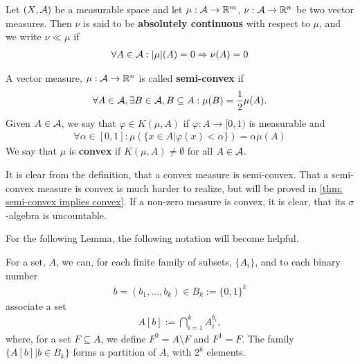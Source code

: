 
\begin{definition}
Let $(X, \mathcal{A})$ be a measurable space and let $\mu: \mathcal{A} \to \mathbb{R}^{m}$, $\nu: \mathcal{A} \to \mathbb{R}^{n}$ be two vector measures. Then $\nu$ is said to be \textbf{absolutely continuous} with respect to $\mu$, and we write $\nu \ll \mu$ if
\begin{align*}
	\forall A\in \mathcal{A} : |\mu|(A) = 0 \Rightarrow \nu(A) = 0
\end{align*}
\end{definition}



\begin{definition}\label{def: convex measure} %
A vector measure, $\mu:\mathcal{A} \to \mathbb{R}^{n}$ is called \textbf{semi-convex} if
\begin{align*}
	\forall A \in \mathcal{A}, \exists B \in \mathcal{A}, B\subseteq A : \mu(B) = \frac{1}{2} \mu(A).
\end{align*}
Given $A\in \mathcal{A}$, we say that $\varphi \in K(\mu, A)$ if $\varphi:A \to [0,1)$ is measurable and
\begin{align*}
	\forall \alpha \in [0,1] : \mu(\{x\in A | \varphi(x) < \alpha \}) = \alpha\mu(A)
\end{align*}
We say that $\mu$ is \textbf{convex} if $K(\mu, A)\neq \emptyset$ for all $A\in \mathcal{A}$.
\end{definition}

It is clear from the definition, that a convex measure is semi-convex. That a semi-convex measure is convex is much harder to realize, but will be proved in \ref{thm: semi-convex implies convex}. If a non-zero measure is convex, it is clear, that its $\sigma$-algebra is uncountable.

For the following Lemma, the following notation will become helpful.
\begin{definition}
For a set, $A$, we can, for each finite family of subsets, $\{A_{i}\}$, and to each binary number
\begin{align*}
	b=(b_{1}, \dots, b_{k}) \in B_{k}:=\{0, 1\}^{k}
\end{align*}
associate a set
\begin{align*}
	A[b] := \bigcap_{i=1}^{k} A_{i}^{b_{i}},
\end{align*}
where, for a set $F\subseteq A$, we define $F^{0}=A\setminus F$ and $F^{1}=F$. The family $\{A[b] | b\in B_{k}\}$ forms a partition of $A$, with $2^{k}$ elements.
\end{definition}

